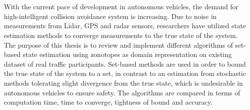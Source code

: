 \chapter{\abstractname}
With the current pace of development in autonomous vehicles, the demand for high-intelligent collision avoidance system is increasing. Due to noise in measurements from Lidar, GPS and radar sensors, researchers have utilized state estimation methods to converge measurements to the true state of the system. The purpose of this thesis is to review and implement different algorithms of set-based state estimation using zonotopes as domain representation on existing dataset of real traffic participants. Set-based methods are used in order to bound the true state of the system to a set, in contrast to an estimation from stochastic methods tolerating slight divergence from the true state, which is undesirable in autonomous vehicles to ensure safety. The algorithms are compared in terms of computation time, time to converge, tightness of bound and accuracy.